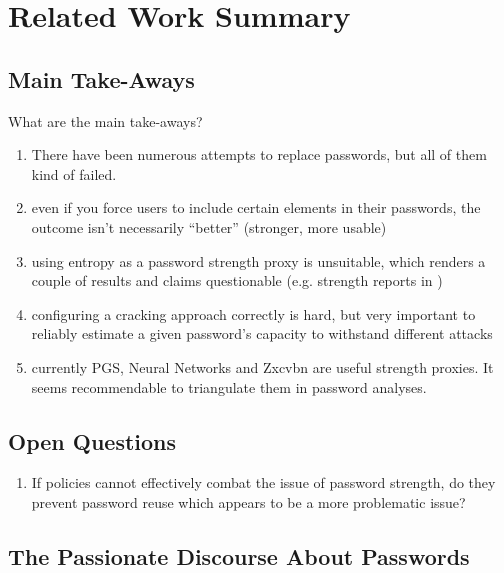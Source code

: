 
\chapter[Related Work Summary]{Related Work Summary}\label{chap:rw:summary}


\section*{Main Take-Aways}
What are the main take-aways?

\begin{enumerate}
	\item There have been numerous attempts to replace passwords, but all of them kind of failed.
	\item even if you force users to include certain elements in their passwords, the outcome isn't necessarily ``better'' (stronger, more usable)
	\item using entropy as a password strength proxy is unsuitable, which renders a couple of results and claims questionable (e.g. strength reports in \cite{Florencio2007LargeScaleStudyPasswordHabits})
	\item configuring a cracking approach correctly is hard, but very important to reliably estimate a given password's capacity to withstand different attacks \cite{Bonneau2012ScienceOfGuessing, Kelley2012GuessAgain, Ur2015MeasuringRealWorldAccuracies, Weir2009PCFG}
	\item currently PGS, Neural Networks and Zxcvbn are useful strength proxies. It seems recommendable to triangulate them in password analyses.  
\end{enumerate}

\section*{Open Questions}
\begin{enumerate}
\item If policies cannot effectively combat the issue of password strength, do they prevent password reuse which appears to be a more problematic issue? 
\end{enumerate}

\section*{The Passionate Discourse About Passwords}\label{sec:rw:passionate_discourse}

